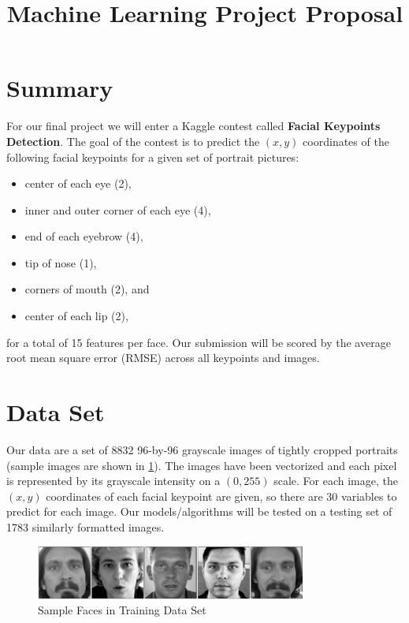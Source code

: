 \documentclass[conference]{IEEEtran}
\begin{document}
\title{Machine Learning Project Proposal}
\author{
\and
{}
}

\maketitle

\section{Summary}
For our final project we will enter a Kaggle contest called \textbf{Facial Keypoints Detection}. The goal of the contest is to predict the $(x,y)$ coordinates of the following facial keypoints for a given set of portrait pictures:
\begin{itemize}
\item center of each eye (2),
\item inner and outer corner of each eye (4),
\item end of each eyebrow (4),
\item tip of nose (1),
\item corners of mouth (2), and
\item center of each lip (2),
\end{itemize}
for a total of 15 features per face. Our submission will be scored by the average root mean square error (RMSE) across all keypoints and images.

\section{Data Set}
Our data are a set of \num{8832} 96-by-96 grayscale images of tightly cropped portraits (sample images are shown in \cref{fig:sample_faces}). The images have been vectorized and each pixel is represented by its grayscale intensity on a $(0,255)$ scale. For each image, the $(x,y)$ coordinates of each facial keypoint are given, so there are 30 variables to predict for each image. Our models/algorithms will be tested on a testing set of \num{1783} similarly formatted images.
\begin{figure}[!ht]
\centering
\includegraphics[width=3.5in]{sample_faces.pdf}
\caption{Sample Faces in Training Data Set}
\label{fig:sample_faces}
\end{figure}
\end{document}
